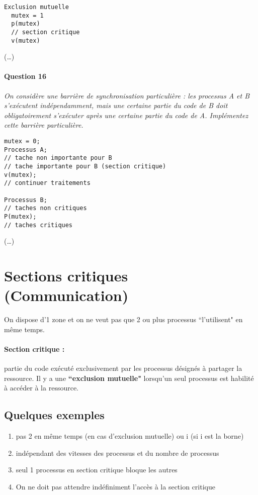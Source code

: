 \documentclass[11pt, a4paper]{article}
\begin{document}
\begin{verbatim}
Exclusion mutuelle
  mutex = 1
  p(mutex)
  // section critique
  v(mutex)
\end{verbatim}

(\dots)

\paragraph{Question 16} \emph{On considère une barrière de synchronisation particulière : les processus A et B s'exécutent indépendamment, mais une certaine partie du code de B doit obligatoirement s'exécuter après une certaine partie du code de A. Implémentez cette barrière particulière.}

\begin{verbatim}
mutex = 0;
Processus A;
// tache non importante pour B
// tache importante pour B (section critique)
v(mutex);
// continuer traitements

Processus B;
// taches non critiques
P(mutex);
// taches critiques
\end{verbatim}

(\dots)


\section{Sections critiques (Communication)}

On dispose d'1 zone et on ne veut pas que 2 ou plus processus ``l'utilisent" en même temps.

\paragraph{Section critique :} partie du code exécuté exclusivement par les processus désignés à partager la ressource. Il y a une \textbf{``exclusion mutuelle"} lorsqu'un seul processus est habilité à accéder à la ressource.

\subsection{Quelques exemples}

\begin{enumerate}
    \item pas 2 en même temps (en cas d'exclusion mutuelle) ou i (si i est la borne)
    \item indépendant des vitesses des processus et du nombre de processus 
    \item seul 1 processus en section critique bloque les autres
    \item On ne doit pas attendre indéfiniment l'accès à la section critique
\end{enumerate}
\end{document}
